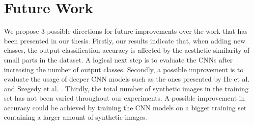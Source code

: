 \section{Future Work}\label{sec:future}

We propose 3 possible directions for future improvements over the work that has been presented in our thesis. Firstly, our results indicate that, when adding new classes, the output classification accuracy is affected by the aesthetic similarity of small parts in the dataset. A logical next step is to evaluate the CNNs after increasing the number of output classes. Secondly, a possible improvement is to evaluate the usage of deeper CNN models such as the ones presented by He et al. \cite{he2016deep} and Szegedy et al. \cite{szegedy2016rethinking}. Thirdly, the total number of synthetic images in the training set has not been varied throughout our experiments. A possible improvement in accuracy could be achieved by training the CNN models on a bigger training set containing a larger amount of synthetic images.
